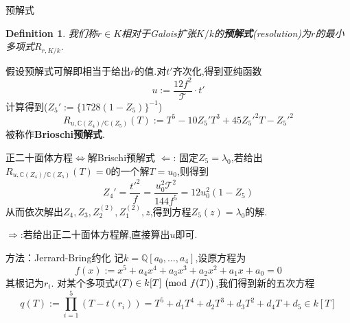 \documentclass[pdf]{beamer}
\numberwithin{equation}{section}
\theoremstyle{plain}
\newtheorem{defn}[theorem]{Definition}
\theoremstyle{plain}
\theoremstyle{remark}
\begin{document}
\begin{frame}[label=fifth]{预解式}
\begin{defn}
我们称$r \in K$相对于Galois扩张$K/k$的\textbf{预解式}(resolution)为$r$的最小多项式$R_{r,K/k}$.
\end{defn}
假设预解式可解即相当于给出$r$的值.对$t'$齐次化,得到亚纯函数
$$u:=\frac{12f^2}{\mathcal{T}} \cdot t'$$
计算得到($Z_5':= \{1728(1-Z_5)\}^{-1}$)
$$R_{u,\mathbb{C}(Z_4)/\mathbb{C}(Z_5)}(T):=T^5-10Z_5'T^3+45{Z_5'}^2T-{Z_5'}^2$$
被称作\textbf{Brioschi预解式}.

\end{frame}
\begin{frame}{正二十面体方程$\Longleftrightarrow$解Brischi预解式}
$\Leftarrow$: 固定$Z_5=\lambda_0$,若给出$R_{u,\mathbb{C}(Z_4)/\mathbb{C}(Z_5)}(T)=0$的一个解$T=u_0$,则得到
$$Z_4'=\frac{t'^2}{f}=\frac{u_0^2\mathcal{T}^2}{144f^5}=12u_0^2(1-Z_5)$$
从而依次解出$Z_4,Z_3,Z_2^{(2)},Z_1^{(2)},z$,得到方程$Z_5(z)=\lambda_0$的解.

$\Rightarrow$:若给出正二十面体方程解,直接算出$u$即可.

\end{frame}
\begin{frame}{方法：Jerrard-Bring约化}
记$k=\mathbb{Q}[a_0,\ldots,a_4]$,设原方程为
$$f(x):=x^5+a_4x^4+a_3x^3+a_2x^2+a_1x+a_0=0$$
其根记为$r_i$.
对某个多项式$t(T) \in k[T] \; \big(\hspace{-0.25cm}\mod f(T)\big)$,我们得到新的五次方程
\begin{equation*}\label{eq:closetoBri}
q(T):=\prod_{i=1}^{5} (T-t(r_i))=T^5+d_1T^4+d_2T^3+d_3T^2+d_4T+d_5 \in k[T]
\end{equation*}

\end{frame}
\end{document}
